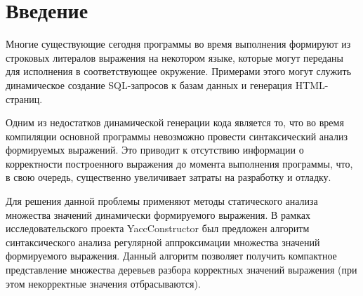 \documentclass[14pt]{matmex-diploma-custom}
\begin{document}


\maketitle
\tableofcontents
\section*{Введение}

Многие существующие сегодня программы во время выполнения формируют из строковых литералов выражения на некотором языке, которые могут переданы для исполнения в соответствующее окружение. Примерами этого могут служить динамическое создание SQL-запросов к базам данных и генерация HTML-страниц.

Одним из недостатков динамической генерации кода является то, что во время компиляции основной программы невозможно провести синтаксический анализ формируемых выражений. Это приводит к отсутствию информации о корректности построенного выражения до момента выполнения программы, что, в свою очередь, существенно увеличивает затраты на разработку и отладку.

Для решения данной проблемы применяют методы статического анализа множества значений динамически формируемого выражения. В рамках исследовательского проекта YaccConstructor \cite{YC} был предложен алгоритм \cite{RelaxedARNGLR} синтаксического анализа регулярной аппроксимации множества значений формируемого выражения. Данный алгоритм позволяет получить компактное представление множества деревьев разбора корректных значений выражения (при этом некорректные значения отбрасываются). 
\end{document}
